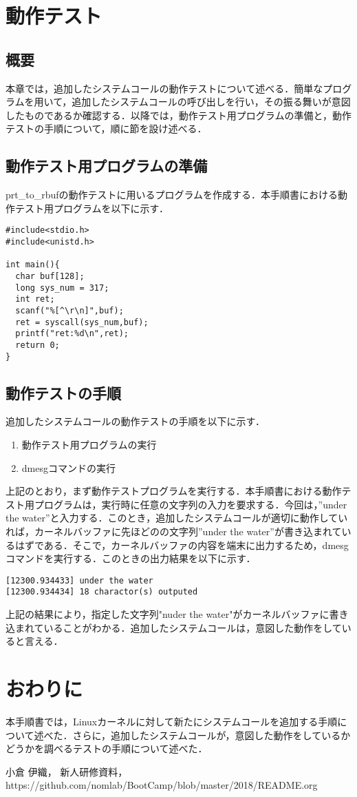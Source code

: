 \documentclass[12pt]{jsarticle}
\begin{document}
\section{動作テスト}
\subsection{概要}
本章では，追加したシステムコールの動作テストについて述べる．簡単なプログラムを用いて，追加したシステムコールの呼び出しを行い，その振る舞いが意図したものであるか確認する．以降では，動作テスト用プログラムの準備と，動作テストの手順について，順に節を設け述べる．
\subsection{動作テスト用プログラムの準備}
prt\_to\_rbufの動作テストに用いるプログラムを作成する．本手順書における動作テスト用プログラムを以下に示す．
\begin{verbatim}
#include<stdio.h>
#include<unistd.h>

int main(){
  char buf[128];
  long sys_num = 317;
  int ret;
  scanf("%[^\r\n]",buf);
  ret = syscall(sys_num,buf);
  printf("ret:%d\n",ret);
  return 0;
}
\end{verbatim}
\subsection{動作テストの手順}
追加したシステムコールの動作テストの手順を以下に示す．
\begin{enumerate}
\item 動作テスト用プログラムの実行
\item dmesgコマンドの実行
\end{enumerate}
上記のとおり，まず動作テストプログラムを実行する．本手順書における動作テスト用プログラムは，実行時に任意の文字列の入力を要求する．今回は，”under the water”と入力する．このとき，追加したシステムコールが適切に動作していれば，カーネルバッファに先ほどのの文字列”under the water”が書き込まれているはずである．そこで，カーネルバッファの内容を端末に出力するため，dmesgコマンドを実行する．このときの出力結果を以下に示す．
\begin{verbatim}
[12300.934433] under the water
[12300.934434] 18 charactor(s) outputed
\end{verbatim}
上記の結果により，指定した文字列"nuder the water"がカーネルバッファに書き込まれていることがわかる．追加したシステムコールは，意図した動作をしていると言える．
\section{おわりに}
本手順書では，Linuxカーネルに対して新たにシステムコールを追加する手順について述べた．さらに，追加したシステムコールが，意図した動作をしているかどうかを調べるテストの手順について述べた．



\begin{thebibliography}{1}
 小倉 伊織， 新人研修資料，https:\slash{}\slash{}github.com\slash{}nomlab\slash{}BootCamp\slash{}blob\slash{}master\slash{}2018\slash{}README.org
\end{thebibliography}
\end{document}

